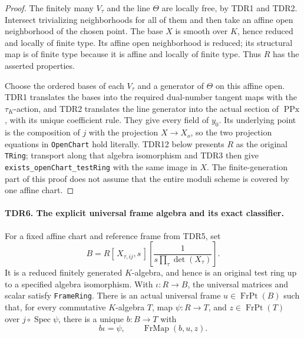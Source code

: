 \documentclass[11pt,a4paper]{article}
\numberwithin{equation}{section}
\theoremstyle{remark}\newtheorem{remark}[theorem]{Remark}
\begin{document}
\begin{proof}
The finitely many \(V_\tau\) and the line \(\Theta\) are locally
free, by TDR1 and TDR2.  Intersect trivializing neighborhoods for
all of them and then take an affine open neighborhood of the chosen
point.  The base \(X\) is smooth over \(K\), hence reduced and
locally of finite type.  Its affine open neighborhood is reduced;
its structural map is of finite type because it is affine and
locally of finite type.  Thus \(R\) has the asserted properties.

Choose the ordered bases of each \(V_\tau\) and a generator of
\(\Theta\) on this affine open.  TDR1 translates the bases into
the required dual-number tangent maps with the \(\tau_K\)-action,
and TDR2 translates the line generator into the actual section of
\(\operatorname{PPx}\), with its unique coefficient rule.
They give every field of \(y_0\).  Its underlying point is the
composition of \(j\) with the projection \(X\to X_o\), so the
two projection equations in \texttt{Open\allowbreak Chart} hold literally.
TDR12 below presents \(R\) as the original \texttt{TRing};
transport along that algebra isomorphism and TDR3 then give
\texttt{exists\_\allowbreak open\allowbreak Chart\_\allowbreak test\allowbreak Ring} with the same image in \(X\).
The finite-generation part of this proof does not assume that
the entire moduli scheme is covered by one affine chart.
\end{proof}

\paragraph{TDR6. The explicit universal frame algebra and its exact classifier.}
\label{claim:TDR6}
For a fixed affine chart and reference frame from TDR5, set
\[
 B=R[\,X_{\tau,ij},s\,]
       \left[\frac{1}{s\prod_\tau\det(X_\tau)}\right].       \tag{TDR.7}
\]
It is a reduced finitely generated \(K\)-algebra, and hence is an
original test ring up to a specified algebra isomorphism.  With
\(\iota:R\to B\), the universal matrices and scalar satisfy
\texttt{Frame\allowbreak Ring}.  There is an actual universal frame
\(u\in\operatorname{FrPt}(B)\) such that, for every commutative
\(K\)-algebra \(T\), map \(\psi:R\to T\), and
\(z\in\operatorname{FrPt}(T)\) over \(j\circ\operatorname{Spec}\psi\),
there is a unique \(b:B\to T\) with
\[
 b\iota=\psi,\qquad\operatorname{FrMap}(b,u,z).             \tag{TDR.8}
\]
\end{document}
